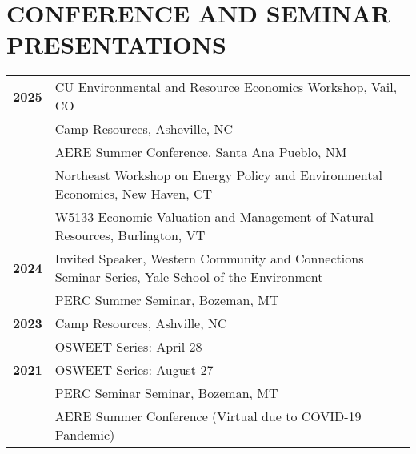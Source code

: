 \documentclass[11pt]{article}
\begin{document}
\section*{CONFERENCE AND SEMINAR PRESENTATIONS}
\begin{longtable}{>{\bfseries}r p{5.5in}}%
2025 & CU Environmental and Resource Economics Workshop, Vail, CO \\  
    & Camp Resources, Asheville, NC \\ 
    & AERE Summer Conference, Santa Ana Pueblo, NM \\ 
    & Northeast Workshop on Energy Policy and Environmental Economics, New Haven, CT \\
    & W5133	Economic Valuation and Management of Natural Resources, Burlington, VT \\
2024 & Invited Speaker, Western Community and Connections Seminar Series, Yale School of the Environment \\
    & PERC Summer Seminar, Bozeman, MT \\
2023 & Camp Resources, Ashville, NC \\
    & OSWEET Series: April 28 \\
2021 & OSWEET Series: August 27 \\
    & PERC Seminar Seminar, Bozeman, MT \\
    & AERE Summer Conference (Virtual due to COVID-19 Pandemic) \\
\end{longtable}
\end{document}
